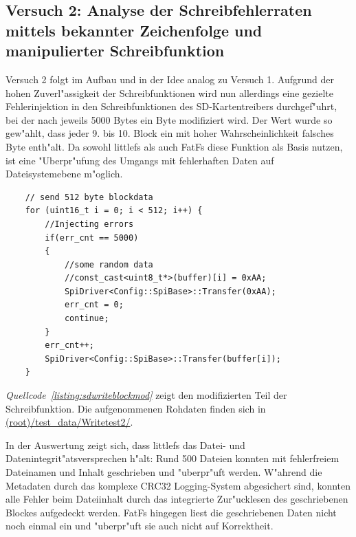 \documentclass[11pt]{article}
\newcommand*{\coderef}[1]{\textit{Quellcode~\ref{#1}}}
\begin{document}
\subsection{Versuch 2: Analyse der Schreibfehlerraten mittels bekannter Zeichenfolge und manipulierter Schreibfunktion}\label{sec:v2}
Versuch 2 folgt im Aufbau und in der Idee analog zu Versuch 1.
Aufgrund der hohen Zuverl"assigkeit der Schreibfunktionen wird nun allerdings eine gezielte Fehlerinjektion 
in den Schreibfunktionen des SD-Kartentreibers durchgef"uhrt,
bei der nach jeweils 5000 Bytes ein Byte modifiziert wird. Der Wert wurde so gew"ahlt, dass jeder 9. bis 10.
Block ein mit hoher Wahrscheinlichkeit falsches Byte enth"alt.
Da sowohl littlefs als auch FatFs diese Funktion als 
Basis nutzen, ist eine "Uberpr"ufung des Umgangs mit fehlerhaften Daten auf Dateisystemebene m"oglich. 


\begin{listing}[H]
    \begin{verbatim}
    // send 512 byte blockdata
    for (uint16_t i = 0; i < 512; i++) {
        //Injecting errors
        if(err_cnt == 5000) 
        { 
            //some random data
            //const_cast<uint8_t*>(buffer)[i] = 0xAA;
            SpiDriver<Config::SpiBase>::Transfer(0xAA);
            err_cnt = 0;
            continue;
        } 
        err_cnt++;
        SpiDriver<Config::SpiBase>::Transfer(buffer[i]);
    }
    \end{verbatim}
\caption{Modifizierter Teil der Funktion \texttt{SD\_WriteBlock} aus Datei \texttt{src/sdcarddriver.hpp}}
\label{listing:sdwriteblockmod}
\end{listing}

\coderef{listing:sdwriteblockmod} zeigt den modifizierten Teil der Schreibfunktion.
Die aufgenommenen Rohdaten finden sich in \href{https://github.com/miko8278/stm32-SPI-SD-card/tree/main/test\_data/Writetest2}{(root)/test\_data/Writetest2/}.

In der Auswertung zeigt sich, dass littlefs das Datei- und Datenintegrit"atsversprechen h"alt: 
Rund 500 Dateien konnten mit fehlerfreiem Dateinamen und Inhalt geschrieben und "uberpr"uft werden.
W"ahrend die Metadaten durch das komplexe CRC32 Logging-System abgesichert sind,
konnten alle Fehler beim Dateiinhalt durch das integrierte Zur"ucklesen des geschriebenen
Blockes aufgedeckt werden. FatFs hingegen liest die geschriebenen Daten nicht noch einmal
ein und "uberpr"uft sie auch nicht auf Korrektheit. 
\end{document}

